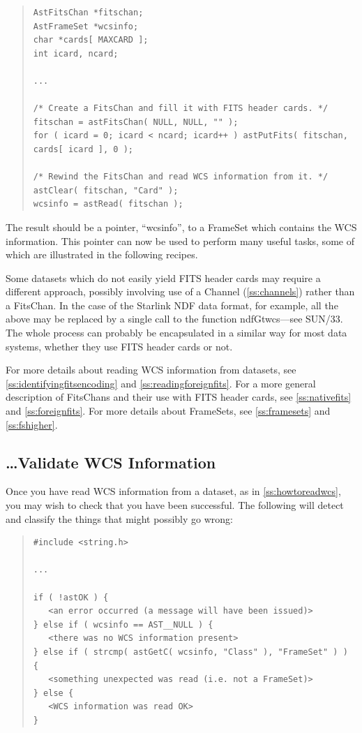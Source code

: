 \documentclass[twoside,11pt]{article}
\newcommand{\htmlref}[2]{#1}
\newcommand{\xref}[3]{#1}
\newcommand{\secref}[1]{\S\ref{#1}}
\renewcommand{\secref}[1]{\ref{#1}}
\begin{document}
\begin{quote}
\small
\begin{verbatim}
AstFitsChan *fitschan;
AstFrameSet *wcsinfo;
char *cards[ MAXCARD ];
int icard, ncard;

...

/* Create a FitsChan and fill it with FITS header cards. */
fitschan = astFitsChan( NULL, NULL, "" );
for ( icard = 0; icard < ncard; icard++ ) astPutFits( fitschan, cards[ icard ], 0 );

/* Rewind the FitsChan and read WCS information from it. */
astClear( fitschan, "Card" );
wcsinfo = astRead( fitschan );
\end{verbatim}
\normalsize
\end{quote}

The result should be a pointer, ``wcsinfo'', to a \htmlref{FrameSet}{FrameSet} which
contains the WCS information. This pointer can now be used to perform
many useful tasks, some of which are illustrated in the following
recipes.

Some datasets which do not easily yield FITS header cards may require
a different approach, possibly involving use of a \htmlref{Channel}{Channel}
(\secref{ss:channels}) rather than a \htmlref{FitsChan}{FitsChan}. In the case of the
Starlink NDF data format, for example, all the above may be replaced
by a single call to the function
\xref{ndfGtwcs}{sun33}{ndfGtwcs}---see \xref{SUN/33}{sun33}{}.  The
whole process can probably be encapsulated in a similar way for
most data systems, whether they use FITS header cards or not.

For more details about reading WCS information from datasets, see
\secref{ss:identifyingfitsencoding} and
\secref{ss:readingforeignfits}. For a more general description of
FitsChans and their use with FITS header cards, see
\secref{ss:nativefits} and \secref{ss:foreignfits}. For more details
about FrameSets, see \secref{ss:framesets} and \secref{ss:fshigher}.

\subsection{\ldots Validate WCS Information}

Once you have read WCS information from a dataset, as in
\secref{ss:howtoreadwcs}, you may wish to check that you have been
successful. The following will detect and classify the things that
might possibly go wrong:

\begin{quote}
\small
\begin{verbatim}
#include <string.h>

...

if ( !astOK ) {
   <an error occurred (a message will have been issued)>
} else if ( wcsinfo == AST__NULL ) {
   <there was no WCS information present>
} else if ( strcmp( astGetC( wcsinfo, "Class" ), "FrameSet" ) ) {
   <something unexpected was read (i.e. not a FrameSet)>
} else {
   <WCS information was read OK>
}
\end{verbatim}
\normalsize
\end{quote}
\end{document}
